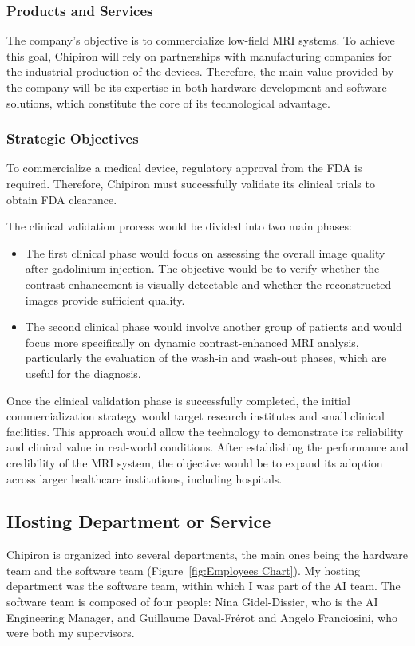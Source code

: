 \documentclass[12pt]{article}
\begin{document}
\subsubsection{Products and Services}

The company's objective is to commercialize low-field MRI systems. To achieve this goal, Chipiron will rely on partnerships with manufacturing companies for the industrial production of the devices. 
Therefore, the main value provided by the company will be its expertise in both hardware development and software solutions, which constitute the core of its technological advantage.

\subsubsection{Strategic Objectives}

To commercialize a medical device, regulatory approval from the FDA is required. 
Therefore, Chipiron must successfully validate its clinical trials to obtain FDA clearance.

The clinical validation process would be divided into two main phases:

\begin{itemize}
    \item The first clinical phase would focus on assessing the overall image quality after gadolinium injection. 
    The objective would be to verify whether the contrast enhancement is visually detectable and whether the reconstructed images provide sufficient quality.
    
    \item The second clinical phase would involve another group of patients and would focus more specifically on dynamic contrast-enhanced MRI analysis, particularly the evaluation of the wash-in and wash-out phases, which are useful for the diagnosis.
\end{itemize}

Once the clinical validation phase is successfully completed, the initial commercialization strategy would target research institutes and small clinical facilities. 
This approach would allow the technology to demonstrate its reliability and clinical value in real-world conditions.
After establishing the performance and credibility of the MRI system, the objective would be to expand its adoption across larger healthcare institutions, including hospitals. 

\subsection{Hosting Department or Service}
Chipiron is organized into several departments, the main ones being the hardware team and the software team (Figure~\ref{fig:Employees Chart}).
My hosting department was the software team, within which I was part of the AI team.
The software team is composed of four people: Nina Gidel-Dissier, who is the AI Engineering Manager, and Guillaume Daval-Frérot and Angelo Franciosini, who were both my supervisors.
\end{document}

